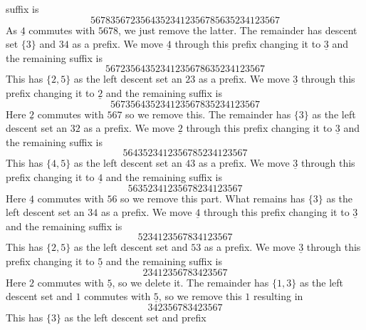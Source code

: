 \documentclass[a4paper]{amsart}
\begin{document}
suffix is
\begin{displaymath}
56783567235643523412356785635234123567
\end{displaymath}
As $\underline{4}$ commutes with $5678$, we just remove the latter.
The remainder has descent set $\{3\}$ and
$34$ as a prefix.  We move $\underline{4}$ through this prefix 
changing it to $\underline{3}$ and the remaining
suffix is
\begin{displaymath}
56723564352341235678635234123567
\end{displaymath}
This has $\{2,5\}$ as the left descent set an
$23$ as a prefix. We move $\underline{3}$ through this prefix 
changing it to $\underline{2}$ and the remaining
suffix is
\begin{displaymath}
567356435234123567835234123567
\end{displaymath}
Here $\underline{2}$ commutes with $567$ so we remove this.
The remainder has $\{3\}$ as the left descent set an
$32$ as a prefix. We move $\underline{2}$ through this prefix 
changing it to $\underline{3}$ and the remaining
suffix is
\begin{displaymath}
5643523412356785234123567
\end{displaymath}
This has $\{4,5\}$ as the left descent set an
$43$ as a prefix. We move $\underline{3}$ through this prefix 
changing it to $\underline{4}$ and the remaining
suffix is
\begin{displaymath}
56352341235678234123567
\end{displaymath}
Here $\underline{4}$ commutes with $56$ so we remove this part.
What remains  has $\{3\}$ as the left descent set an
$34$ as a prefix. We move $\underline{4}$ through this prefix 
changing it to $\underline{3}$ and the remaining
suffix is
\begin{displaymath}
5234123567834123567
\end{displaymath}
This  has $\{2,5\}$ as the left descent set and
$53$ as a prefix. We move $\underline{3}$ through this prefix 
changing it to $\underline{5}$ and the remaining
suffix is
\begin{displaymath}
23412356783423567
\end{displaymath}
Here $2$ commutes with $\underline{5}$, so we delete it.
The remainder has $\{1,3\}$ as the left descent set and
$1$ commutes with $\underline{5}$, so we remove this $1$
resulting in 
\begin{displaymath}
342356783423567
\end{displaymath}
This has $\{3\}$ as the left descent set and prefix 
\end{document}
